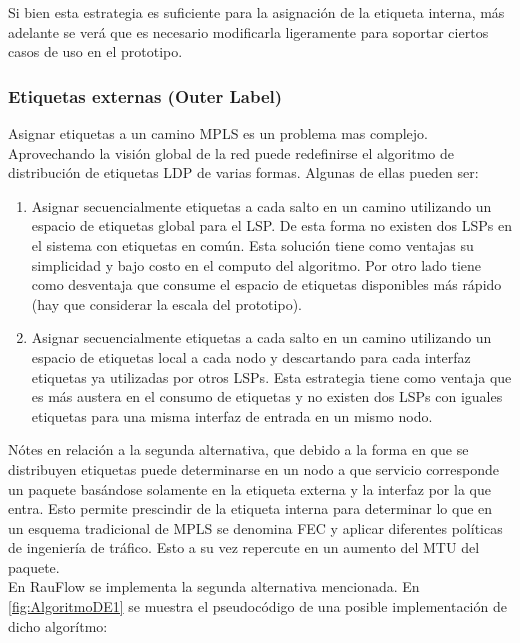 Si bien esta estrategia es suficiente para la asignación de la etiqueta interna, m\'as adelante se ver\'a que es necesario modificarla ligeramente para soportar ciertos casos de uso en el prototipo.

\subsubsection{Etiquetas externas (Outer Label)}
Asignar etiquetas a un camino MPLS es un problema mas complejo. Aprovechando la visión global de la red puede redefinirse el algoritmo de distribución de etiquetas LDP de varias formas. Algunas de ellas pueden ser:

\begin{enumerate}
\item Asignar secuencialmente etiquetas a cada salto en un camino utilizando un espacio de etiquetas global para el LSP. De esta forma no existen dos LSPs en el sistema con etiquetas en com\'un. Esta solución tiene como ventajas su simplicidad y bajo costo en el computo del algoritmo. Por otro lado tiene como desventaja que consume el espacio de etiquetas disponibles m\'as r\'apido (hay que considerar la escala del prototipo).

\item Asignar secuencialmente etiquetas a cada salto en un camino utilizando un espacio de etiquetas local a cada nodo y descartando para cada interfaz etiquetas ya utilizadas por otros LSPs. Esta estrategia tiene como ventaja que es m\'as austera en el consumo de etiquetas y no existen dos LSPs con iguales etiquetas para una misma interfaz de entrada en un mismo nodo.
\end{enumerate}

N\'otes en relación a la segunda alternativa, que debido a la forma en que se distribuyen etiquetas puede determinarse en un nodo a que servicio corresponde un paquete bas\'andose solamente en la etiqueta externa y la interfaz por la que entra. Esto permite prescindir de la etiqueta interna para determinar lo que en un esquema tradicional de MPLS se denomina FEC y aplicar diferentes pol\'iticas de ingenier\'ia de tr\'afico. Esto a su vez repercute en un aumento del MTU del paquete.\\ 

En RauFlow se implementa la segunda alternativa mencionada. En \ref{fig:AlgoritmoDE1} se muestra el pseudoc\'odigo de una posible implementaci\'on de dicho algor\'itmo:\\

